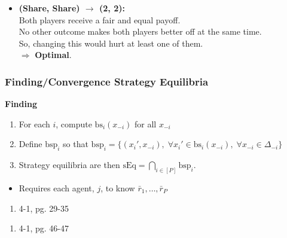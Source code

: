 \begin{example}
\begin{enumerate}
\begin{enumerate}
\begin{itemize}
                \item \textbf{(Share, Share) $\rightarrow$ (2, 2):} \\
                Both players receive a fair and equal payoff. \\
                No other outcome makes both players better off at the same time. \\
                So, changing this would hurt at least one of them. \\
                $\Rightarrow$ \textbf{Optimal}.
            \end{itemize}                                 
        \end{enumerate}
    \end{enumerate}
\end{example}
\newpage

\subsubsection{Finding/Convergence Strategy Equilibria}
\begin{process} \textbf{Finding}
    \begin{enumerate}
        \item For each $i$, compute $\text{bs}_i (x_{-i})$ for all $x_{-i}$
        \item Define $\text{bsp}_i$ so that $\text{bsp}_i = \{(x_i',x_{-i}), \; \forall x_i' \in \text{bs}_i (x_{-i}), \; \forall x_{-i} \in \Delta_{-i}\}$
        \item Strategy equilibria are then $\text{sEq} = \bigcap_{i\in [P]} \text{bsp}_i$.
    \end{enumerate}
    \begin{itemize}
        \item Requires each agent, $j$, to know $\bar{r}_1,\ldots,\bar{r}_P$
    \end{itemize}
\end{process}
\newpage

\begin{example}
    \begin{enumerate}
        \item 4-1, pg. 29-35
    \end{enumerate}
\end{example}

\begin{example}
    \begin{enumerate}
        \item 4-1, pg. 46-47
    \end{enumerate}
\end{example}

